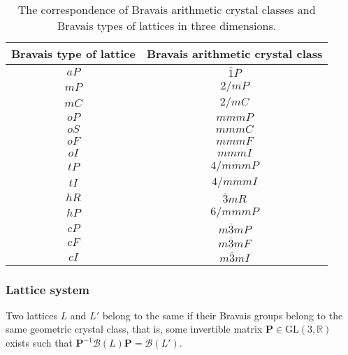 \begin{table}[htb]
  \centering
  \caption{The correspondence of Bravais arithmetic crystal classes and Bravais types of lattices in three dimensions.}
  \label{table:arithmetic-class-3d}
  \begin{tabular}{cc}
    \hline\hline
    Bravais type of lattice & Bravais arithmetic crystal class \\ \hline
    $aP$                    & $\overline{1}P$                  \\
    $mP$                    & $2/mP$                           \\
    $mC$                    & $2/mC$                           \\
    $oP$                    & $mmmP$                           \\
    $oS$                    & $mmmC$                           \\
    $oF$                    & $mmmF$                           \\
    $oI$                    & $mmmI$                           \\
    $tP$                    & $4/mmmP$                         \\
    $tI$                    & $4/mmmI$                         \\
    $hR$                    & $\overline{3}mR$                 \\
    $hP$                    & $6/mmmP$                         \\
    $cP$                    & $m\overline{3}mP$                \\
    $cF$                    & $m\overline{3}mF$                \\
    $cI$                    & $m\overline{3}mI$                \\
    \hline\hline
  \end{tabular}
\end{table}

\subsubsection{\label{sec:lattice-system}Lattice system}

\begin{screen}
  \begin{defn}
    Two lattices $L$ and $L'$ belong to the same  if their Bravais groups belong to the same geometric crystal class, that is, some invertible matrix $\bm{P} \in \mathrm{GL}(3, \mathbb{R})$ exists such that $\bm{P}^{-1} \mathcal{B}(L) \bm{P} = \mathcal{B}(L')$.
  \end{defn}
\end{screen}

